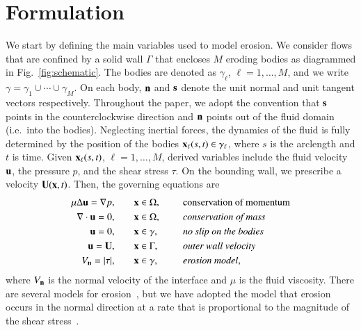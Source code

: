 \documentclass[preprint, 10pt]{elsarticle}
\begin{document}
\section{Formulation}
\label{s:formulation}
We start by defining the main variables used to model erosion.  We
consider flows that are confined by a solid wall $\Gamma$ that encloses
$M$ eroding bodies as diagrammed in Fig.~\ref{fig:schematic}.  The
bodies are denoted as $\gamma_\ell$, $\ell=1,\ldots,M$, and we write
$\gamma = \gamma_1 \cup \cdots \cup \gamma_M$.  On each body, $\nn$ and
$\ss$ denote the unit normal and unit tangent vectors respectively.
Throughout the paper, we adopt the convention that $\ss$ points in the
counterclockwise direction and $\nn$ points out of the fluid domain
(i.e.~into the bodies). Neglecting inertial forces, the dynamics of the
fluid is fully determined by the position of the bodies $\xx_\ell(s,t)
\in \gamma_\ell$, where $s$ is the arclength and $t$ is time.  Given
$\xx_\ell(s,t)$, $\ell=1,\ldots,M$, derived variables include the fluid
velocity $\uu$, the pressure $p$, and the shear stress $\tau$.   On the
bounding wall, we prescribe a velocity $\UU(\xx,t)$.  Then, the
governing equations are
\begin{equation}
\label{eqn:erosionModel}
\begin{split}
  \mu \Delta \uu = \grad p, &\hspace{20pt} \xx \in \Omega, \gap &&\mbox{conservation
of momentum}\\
\grad \cdot \uu = 0, &\hspace{20pt} \xx \in \Omega, \gap
&&\mbox{\em conservation of mass} \\
\uu = 0, &\hspace{20pt} \xx \in \gamma, \gap &&\mbox{\em no slip on the
bodies} \\
\uu = \UU, &\hspace{20pt} \xx \in \Gamma, \gap &&\mbox{\em outer wall
velocity} \\
\Vn = \abs{\tau}, &\hspace{20pt} \xx \in \gamma,
&&\mbox{\em erosion model},
\end{split}
\end{equation}
where $\Vn$ is the normal velocity of the interface and $\mu$ is the
fluid viscosity.  There are several models for
erosion~\cite{par-izu2000,lag2000}, but we have adopted the model that
erosion occurs in the normal direction at a rate that is proportional to
the magnitude of the shear stress~\cite{moo-ris-chi-zha-she2013}.  
\end{document}
